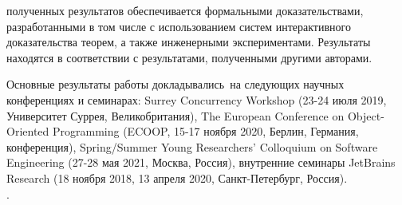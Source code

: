 {\reliability} полученных результатов обеспечивается 
формальными доказательствами, разработанными в том числе с использованием
систем интерактивного доказательства теорем, 
а также инженерными экспериментами. 
Результаты находятся в соответствии с результатами, полученными другими авторами.

{\probation} Основные результаты работы докладывались~на
следующих научных конференциях и семинарах:
Surrey Concurrency Workshop (23-24 июля 2019, Университет Суррея, Великобритания),
The European Conference on Object-Oriented Programming
(ECOOP, 15-17 ноября 2020, Берлин, Германия, конференция),
Spring/Summer Young Researchers' Colloquium on Software Engineering
(27-28 мая 2021, Москва, Россия),
внутренние семинары JetBrains Research
(18 ноября 2018, 13 апреля 2020, Санкт-Петербург, Россия). \\
.


